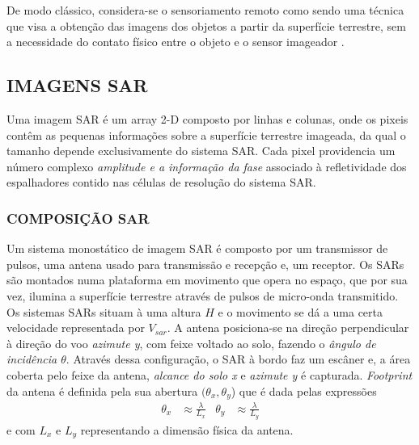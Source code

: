 \documentclass[a4paper,12pt]{article}
\begin{document}
De modo clássico, considera-se o sensoriamento remoto como sendo uma técnica que visa a obtenção das imagens dos objetos a partir da superfície terrestre, sem a necessidade do contato físico entre o objeto e o sensor imageador \cite{evlyn1992}. 


\subsection{IMAGENS SAR}
\label{subsec:ImgSar}

Uma imagem SAR é um array 2-D composto por linhas e colunas, onde os pixeis contêm as pequenas informações sobre a superfície terrestre imageada, da qual o tamanho depende exclusivamente do sistema SAR. Cada pixel providencia um número complexo \textit{amplitude e a informação da fase} associado à refletividade dos espalhadores contido nas células de resolução do sistema SAR.

\subsubsection{COMPOSIÇÃO SAR}
\label{Subsubsec:Cs}

Um sistema monostático de imagem SAR é composto por um transmissor de pulsos, uma antena usado para transmissão e recepção e, um receptor. Os SARs são montados numa plataforma em movimento que opera no espaço, que por sua vez, ilumina a superfície terrestre através de pulsos de micro-onda transmitido. Os sistemas SARs situam à uma altura $H$ e o movimento se dá a uma certa velocidade representada por $V_{sar}$. A antena posiciona-se na direção perpendicular à direção do voo \textit{azimute y}, com feixe voltado ao solo, fazendo o \textit{ângulo de incidência $\theta$}. Através dessa configuração, o SAR à bordo faz um escâner e, a área coberta pelo feixe da antena, \textit{alcance do solo x} e \textit{azimute y} é capturada. \textit{Footprint} da antena é definida pela sua abertura $(\theta_{x}, \theta_{y}$) que é dada pelas expressões
\begin{align}
    \theta_{x} & \approx\frac{\lambda}{L_{x}}  & 
    \theta_{y} & \approx\frac{\lambda}{L_{y}}
\end{align} e
com $L_{x}$ e $L_{y}$ representando a dimensão física da antena.
\end{document}
